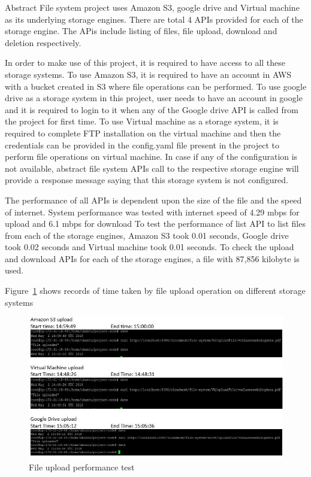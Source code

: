 Abstract File system project uses Amazon S3, google drive and Virtual machine 
as its underlying storage engines. There are total 4 APIs provided for each of 
the storage engine. The APis include listing of files, file upload, download 
and deletion respectively. 

In order to make use of this project, it is required to have access to all 
these storage systems. To use Amazon S3, it is required to have an account in 
AWS with a bucket created in S3 where file operations can be performed. To use 
google drive as a storage system in this project, user needs to have an account 
in google and it is required to login to it when any of the Google drive API is 
called from the project for first time. To use Virtual machine as a storage 
system, it is required to complete FTP installation on the virtual machine and 
then the credentials can be provided in the config.yaml file present in the 
project to perform file operations on virtual machine.
In case if any of the configuration is not available, abstract file system APIs 
call to the respective storage engine will provide a response message saying 
that this storage system is not configured. 

The performance of all APIs is dependent upon the size of the file and the 
speed of internet. System performance was tested with internet speed of 4.29 
mbps for upload and 6.1 mbps for download
To test the performance of list API to list files from each of the storage 
engines, Amazon S3 took 0.01 seconds, Google drive took 0.02 seconds and 
Virtual machine took 0.01 seconds.
To check the upload and download APIs for each of the storage engines, a file 
with 87,856 kilobyte is used.

Figure~\ref{fig:upload-test} shows records of time taken 
by file upload operation on different storage systems

\begin{figure}[!ht]
        \centering\includegraphics[width=\columnwidth]
        {image/upload-test.JPG}
        \caption{File upload performance test}\label{fig:upload-test}
\end{figure}


